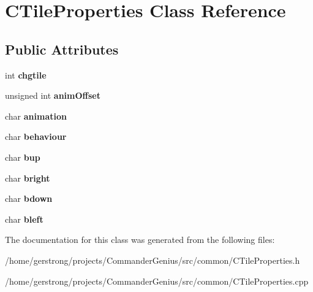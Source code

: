 \hypertarget{class_c_tile_properties}{
\section{CTileProperties Class Reference}
\label{class_c_tile_properties}
}
\subsection*{Public Attributes}
\begin{DoxyCompactItemize}
\item 
\hypertarget{class_c_tile_properties_a209402d133c3eb3db00655b9455a8e6e}{
int {\bfseries chgtile}}
\label{class_c_tile_properties_a209402d133c3eb3db00655b9455a8e6e}

\item 
\hypertarget{class_c_tile_properties_a51c04966c8d761e7b8bc2b30c1647ce3}{
unsigned int {\bfseries animOffset}}
\label{class_c_tile_properties_a51c04966c8d761e7b8bc2b30c1647ce3}

\item 
\hypertarget{class_c_tile_properties_a8f142f5076b6c9d37e75972daeaac8d6}{
char {\bfseries animation}}
\label{class_c_tile_properties_a8f142f5076b6c9d37e75972daeaac8d6}

\item 
\hypertarget{class_c_tile_properties_a8392f20f342d8c20b389cf4c1ed814d4}{
char {\bfseries behaviour}}
\label{class_c_tile_properties_a8392f20f342d8c20b389cf4c1ed814d4}

\item 
\hypertarget{class_c_tile_properties_a4b9e865565da92b8696d92c0ac303410}{
char {\bfseries bup}}
\label{class_c_tile_properties_a4b9e865565da92b8696d92c0ac303410}

\item 
\hypertarget{class_c_tile_properties_a9105a3da8bb9eb4098a2a7f0e6b3ec71}{
char {\bfseries bright}}
\label{class_c_tile_properties_a9105a3da8bb9eb4098a2a7f0e6b3ec71}

\item 
\hypertarget{class_c_tile_properties_adc260e2054289da48be5f3fcea23ef64}{
char {\bfseries bdown}}
\label{class_c_tile_properties_adc260e2054289da48be5f3fcea23ef64}

\item 
\hypertarget{class_c_tile_properties_acce896764ff0ef2472ce62eb12840168}{
char {\bfseries bleft}}
\label{class_c_tile_properties_acce896764ff0ef2472ce62eb12840168}

\end{DoxyCompactItemize}


The documentation for this class was generated from the following files:\begin{DoxyCompactItemize}
\item 
/home/gerstrong/projects/CommanderGenius/src/common/CTileProperties.h\item 
/home/gerstrong/projects/CommanderGenius/src/common/CTileProperties.cpp\end{DoxyCompactItemize}
